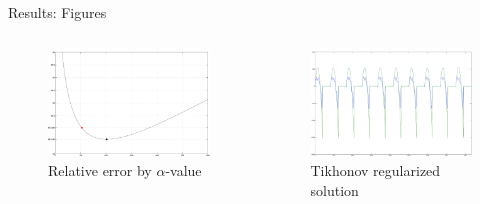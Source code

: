\documentclass[final]{beamer}
\begin{document}
\begin{frame}[t]
\begin{columns}[t]
\begin{column}{.465\textwidth}
\begin{block}{Results: Figures}
\begin{columns}
\begin{column}{.5\textwidth}
\begin{center}
\begin{figure}
\includegraphics[width=.95\linewidth]{alpha_errs_iter.eps}
\caption{Relative error by $\alpha$-value}
\label{fig:alpha-iter}
\end{figure}
\end{center}
\end{column}

\begin{column}{.5\textwidth}
\begin{center}
\begin{figure}
\includegraphics[width=.95\linewidth]{alpha_errs_morozov.eps}
\caption{Tikhonov regularized solution}
\label{fig:iter-tik}
\end{figure}
\end{center}
\end{column}

\end{columns}



\end{block}
\end{column}
\end{columns}
\end{frame}
\end{document}

